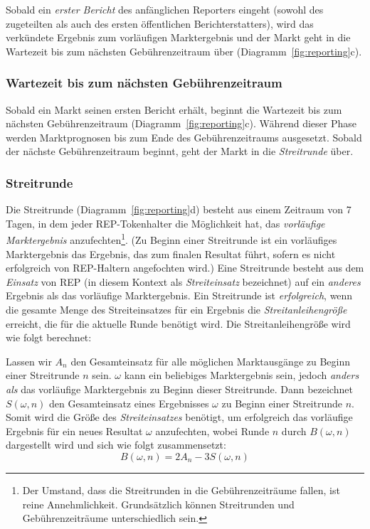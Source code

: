 \documentclass[floatfix,reprint,nofootinbib,amsmath,amssymb,epsfig,pre,floats,letterpaper,groupedaffiliation]{revtex4-1}
\newcommand{\beq}{\begin{equation}}
\newcommand{\eeq}{\end{equation}}
\theoremstyle{definition}
\theoremstyle{definition}
\theoremstyle{definition}
\begin{document}
Sobald ein \textit{erster Bericht} des anfänglichen Reporters eingeht (sowohl des zugeteilten als auch des ersten öffentlichen Berichterstatters), wird das verkündete Ergebnis zum vorläufigen Marktergebnis und der Markt geht in die Wartezeit bis zum nächsten Gebührenzeitraum über (Diagramm~\ref{fig:reporting}c).

\subsubsection{Wartezeit bis zum nächsten Gebührenzeitraum}

Sobald ein Markt seinen ersten Bericht erhält, beginnt die Wartezeit bis zum nächsten Gebührenzeitraum (Diagramm~\ref{fig:reporting}c). Während dieser Phase werden Marktprognosen bis zum Ende des Gebührenzeitraums ausgesetzt. Sobald der nächste Gebührenzeitraum beginnt, geht der Markt in die \textit{Streitrunde} über.

\subsubsection{Streitrunde}

Die Streitrunde (Diagramm~\ref{fig:reporting}d) besteht aus einem Zeitraum von 7 Tagen, in dem jeder REP-Tokenhalter die Möglichkeit hat, das \textit{vorläufige Marktergebnis} anzufechten\footnote{Der Umstand, dass die Streitrunden in die Gebührenzeiträume fallen, ist reine Annehmlichkeit. Grundsätzlich können Streitrunden und Gebührenzeiträume unterschiedlich sein.}. (Zu Beginn einer Streitrunde ist ein vorläufiges Marktergebnis das Ergebnis, das zum finalen Resultat führt, sofern es nicht erfolgreich von REP-Haltern angefochten wird.) Eine Streitrunde besteht aus dem \textit{Einsatz} von REP (in diesem Kontext als \textit{Streiteinsatz} bezeichnet) auf ein \textit{anderes} Ergebnis als das vorläufige Marktergebnis. Ein Streitrunde ist \textit{erfolgreich}, wenn die gesamte Menge des Streiteinsatzes für ein Ergebnis die \textit{Streitanleihengröße} erreicht, die für die aktuelle Runde benötigt wird. Die Streitanleihengröße wird wie folgt berechnet:

Lassen wir $A_n$ den Gesamteinsatz für alle möglichen Marktausgänge zu Beginn einer Streitrunde $n$ sein. $\omega$ kann ein beliebiges Marktergebnis sein, jedoch \textit{anders als} das vorläufige Marktergebnis zu Beginn dieser Streitrunde. Dann bezeichnet $S(\omega, n)$ den Gesamteinsatz eines Ergebnisses $\omega$ zu Beginn einer Streitrunde $n$. Somit wird die Größe des \textit{Streiteinsatzes} benötigt, um erfolgreich das vorläufige Ergebnis für ein neues Resultat $\omega$ anzufechten, wobei Runde $n$ durch $B(\omega, n)$ dargestellt wird und sich wie folgt zusammensetzt:
\beq \label{eq:bond_size}
B(\omega, n) = 2A_n - 3S(\omega, n)
\eeq
\end{document}
